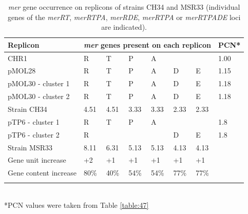 \begin{table}[ht]
\caption{\textit{mer} gene  occurrence  on  replicons  of  strains  CH34  and  MSR33  (individual  genes  of  the \textit{merRT}, \textit{merRTPA}, \textit{merRDE}, \textit{merRTPA} or \textit{merRTPADE} loci are indicated).\\}
\label{table:48}%
{%
\begin{tabular*}{\columnwidth}{@{}llllllll@{}}
\hline
 \textbf{Replicon} & \multicolumn{6}{c}{\textbf{\textit{mer} genes present on each replicon }} & \textbf{PCN*} \\
 \hline
CHR1 & R & T & P & A &   &   & 1.00\\
pMOL28 & R & T & P & A & D & E & 1.15\\
pMOL30 - cluster 1 & R & T & P & A & D & E & 1.18\\
pMOL30 - cluster 2 & R & T & P & A & D & E & 1.18\\
Strain CH34 & 4.51 & 4.51 & 3.33 & 3.33 & 2.33 & 2.33 & \\
pTP6 - cluster 1 & R & T & P & A &  &  & 1.8\\
pTP6 - cluster 2 & R &  &  &  & D & E & 1.8\\
Strain MSR33 & 8.11 & 6.31 & 5.13 & 5.13 & 4.13 & 4.13 & \\
Gene unit increase & +2 & +1 & +1 & +1 & +1 & +1 & \\
Gene content increase & 80\% & 40\% & 54\% & 54\% & 77\% & 77\% & \\
\\
\hline
\hline
\end{tabular*}
}
\\
{
\footnotesize{*PCN values were taken from Table \ref{table:47}}
}
\end{table}